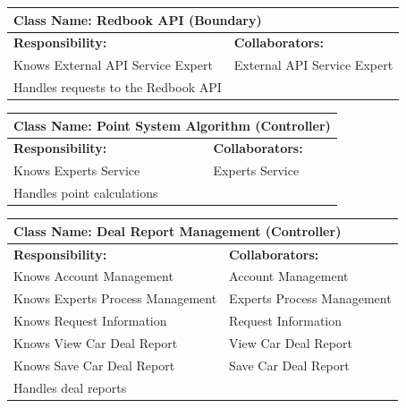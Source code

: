 \documentclass[]{article}
\begin{document}
\begin{itemize}
\begin{table}[H]
            \begin{tabular}{|p{6cm}|p{6cm}|}
            \hline 
             \multicolumn{2}{|l|}{\textbf{Class Name: Redbook API (Boundary)}} \\
            \hline
            \textbf{Responsibility:} & \textbf{Collaborators:} \\
            \hline
            Knows External API Service Expert & External API Service Expert \\
            Handles requests to the Redbook API & \\
            \hline
            \end{tabular}
        \end{table}
        \begin{table}[H]
            \centering
            \begin{tabular}{|p{6cm}|p{6cm}|}
            \hline 
             \multicolumn{2}{|l|}{\textbf{Class Name: Point System Algorithm (Controller)}} \\
            \hline
            \textbf{Responsibility:} & \textbf{Collaborators:} \\
            \hline
            Knows Experts Service & Experts Service \\
            Handles point calculations & \\
            \hline
            \end{tabular}
        \end{table}
        \begin{table}[H]
            \centering
            \begin{tabular}{|p{6cm}|p{6cm}|}
            \hline 
             \multicolumn{2}{|l|}{\textbf{Class Name: Deal Report Management (Controller)}} \\
            \hline
            \textbf{Responsibility:} & \textbf{Collaborators:} \\
            \hline
            Knows Account Management & Account Management \\
            Knows Experts Process Management & Experts Process Management \\
            Knows Request Information & Request Information \\
            Knows View Car Deal Report & View Car Deal Report \\
            Knows Save Car Deal Report & Save Car Deal Report \\
            Handles deal reports & \\

\end{tabular}
\end{table}
\end{itemize}
\end{document}

